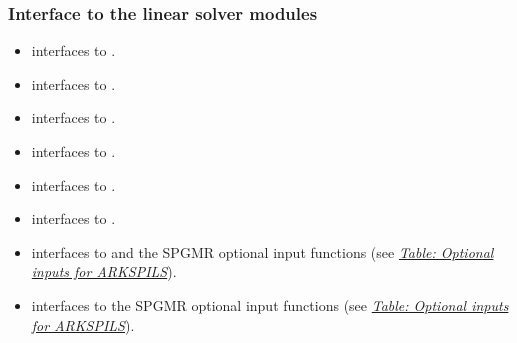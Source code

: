 \documentclass[letterpaper,10pt,english]{sphinxmanual}
\begin{document}
\subsubsection{Interface to the linear solver modules}
\label{f_interface/Routines:interface-to-the-linear-solver-modules}\begin{itemize}
\item {} 
{\hyperref[f_interface/Usage:f/_/FARKDENSE]{}} interfaces to {\hyperref[c_interface/User_callable:ARKDense]{}}.

\item {} 
{\hyperref[f_interface/Usage:f/_/FARKLAPACKDENSE]{}} interfaces to {\hyperref[c_interface/User_callable:ARKLapackDense]{}}.

\item {} 
{\hyperref[f_interface/Usage:f/_/FARKDENSESETJAC]{}} interfaces to {\hyperref[c_interface/User_callable:ARKDlsSetDenseJacFn]{}}.

\item {} 
{\hyperref[f_interface/Usage:f/_/FARKBAND]{}} interfaces to {\hyperref[c_interface/User_callable:ARKBand]{}}.

\item {} 
{\hyperref[f_interface/Usage:f/_/FARKLAPACKBAND]{}} interfaces to {\hyperref[c_interface/User_callable:ARKLapackBand]{}}.

\item {} 
{\hyperref[f_interface/Usage:f/_/FARKBANDSETJAC]{}} interfaces to {\hyperref[c_interface/User_callable:ARKDlsSetBandJacFn]{}}.

\item {} 
{\hyperref[f_interface/Usage:f/_/FARKSPGMR]{}} interfaces to {\hyperref[c_interface/User_callable:ARKSpgmr]{}} and the SPGMR optional input
functions (see {\hyperref[c_interface/User_callable:cinterface-arkspilsinputtable]{\emph{Table: Optional inputs for ARKSPILS}}}).

\item {} 
{\hyperref[f_interface/Usage:f/_/FARKSPGMRREINIT]{}} interfaces to the SPGMR optional input
functions (see {\hyperref[c_interface/User_callable:cinterface-arkspilsinputtable]{\emph{Table: Optional inputs for ARKSPILS}}}).


\end{itemize}
\end{document}
